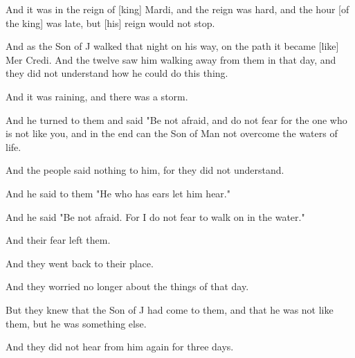 \Sentence
{ \hX{} }
{ \eX{} }
{
And it was in the reign of [king] Mardi, and the reign was hard, and the hour [of the king] was late, but [his] reign would not stop.
}

\Sentence
{ \hX{} }
{ \eX{} }
{
And as the Son of J walked that night on his way, on the path it became [like] Mer Credi. And the twelve saw him walking away from them in that day, and they did not understand how he could do this thing.
}

\Sentence
{ \hX{} }
{ \eX{} }
{
And it was raining, and there was a storm.
}

\Sentence
{ \hX{} }
{ \eX{} }
{
And he turned to them and said "Be not afraid, and do not fear for the one who is not like you, and in the end can the Son of Man not overcome the waters of life.
}

\Sentence
{ \hX{} }
{ \eX{} }
{
And the people said nothing to him, for they did not understand.
}

\Sentence
{ \hX{} }
{ \eX{} }
{
And he said to them "He who has ears let him hear."
}

\Sentence
{ \hX{} }
{ \eX{} }
{
And he said "Be not afraid. For I do not fear to walk on in the water."
}

\Sentence
{ \hX{} }
{ \eX{} }
{
And their fear left them.
}

\Sentence
{ \hX{} }
{ \eX{} }
{
And they went back to their place.
}

\Sentence
{ \hX{} }
{ \eX{} }
{
And they worried no longer about the things of that day.
}

\Sentence
{ \hX{} }
{ \eX{} }
{
But they knew that the Son of J had come to them, and that he was not like them, but he was something else.
}

\Sentence
{ \hX{} }
{ \eX{} }
{
And they did not hear from him again for three days.
}
